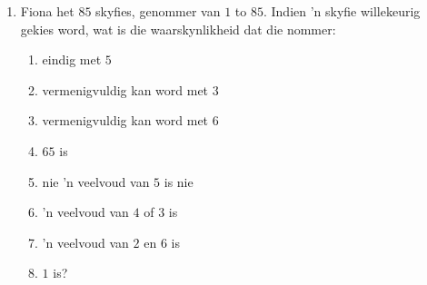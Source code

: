 \begin{exercises}{}
{\begin{enumerate}[itemsep=3pt, label=\textbf{\arabic*}.]
  \item Fiona het $85$ skyfies, genommer van $1$ to
    $85$. Indien 'n skyfie willekeurig gekies word, wat is die waarskynlikheid dat die nommer: 
    \begin{enumerate}[noitemsep, label=\textbf{(\alph*)} ]
    \item eindig met $5$
    \item vermenigvuldig kan word met $3$
    \item vermenigvuldig kan word met  $6$
    \item $65$ is
    \item nie 'n veelvoud van $5$ is nie
    \item 'n veelvoud van $4$ of $3$ is
    \item 'n veelvoud van $2$ en $6$ is
    \item  $1$ is?
    \end{enumerate}
  \end{enumerate}

}
\end{exercises}

